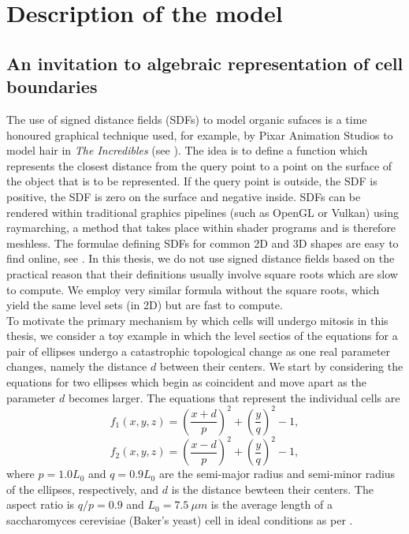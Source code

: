\chapter{ Description of the model \label{ch:numero_uno}}
\section{An invitation to algebraic representation of cell boundaries}\label{sec:introSDFs}
The use of signed distance fields (SDFs) to model organic sufaces
is a time honoured graphical technique used, for example, by Pixar
Animation Studios to model hair in \textit{The Incredibles} 
(see \cite{petrovic2005volumetric}). The idea is to define a 
function which represents the closest distance from the query point
to a point on the surface of the object that is to be represented. 
If the query point is outside, the SDF is positive,
the SDF is zero on the surface and negative inside. SDFs can be 
rendered within traditional graphics pipelines (such as OpenGL or Vulkan)
using raymarching, a method that takes place within shader programs and 
is therefore meshless. The formulae defining SDFs for common 2D and 3D 
shapes are easy to find online, see \cite{key}. In this thesis,
we do not use signed distance fields based on the practical 
reason that their definitions usually involve square roots
which are slow to compute. We employ very similar formula
without the square roots, which yield the same level sets (in 2D)
but are fast to compute.
\\

To motivate the primary mechanism by which cells will undergo mitosis 
in this thesis, we consider a toy example in which the level sectios of the equations for
a pair of ellipses undergo a catastrophic topological change as one real parameter 
changes, namely the distance $d$ between their centers. We start by considering 
the equations for two ellipses which 
begin as coincident and move apart as the parameter $d$ becomes larger. 
The equations that represent the individual cells are
\begin{equation*}
    f_1(x,y,z) = \left( \frac{x+d}{p} \right)^2 + \left( \frac{y}{q} \right)^2 - 1,
\end{equation*}
\begin{equation*}
    f_2(x,y,z) = \left( \frac{x-d}{p} \right)^2 + \left( \frac{y}{q} \right)^2 - 1,
\end{equation*}
where $p=1.0 L_0$ and $q=0.9 L_0$ are the semi-major radius and semi-minor radius
of the ellipses, respectively, 
and $d$ is the distance bewteen their centers. The aspect ratio is $q/p = 0.9$ and $L_0 = 7.5 \ \mu m$
is the average length of a  saccharomyces cerevisiae (Baker's yeast) cell in ideal conditions as per
\cite{chavez2024cell}.
\\

